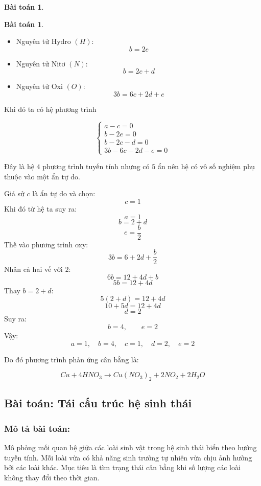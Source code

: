 \documentclass[12pt,a4paper,oneside]{book}
\theoremstyle{theorem}
\theoremstyle{definition}
\newtheorem{bt}[theorem2]{Bài toán}
\begin{document}
\begin{bt}
\begin{bt}
\begin{itemize}
    \item Nguyên tử Hydro \((H)\):
    \[
    b=2e
    \]

    \item Nguyên tử Nitơ \((N)\):
    \[
    b=2c+d
    \]

    \item Nguyên tử Oxi \((O)\):
    \[
    3b=6c+2d+e
    \]
\end{itemize}

Khi đó ta có hệ phương trình

\[
\begin{cases}
a-c=0\\
b-2e=0\\
b-2c-d=0\\
3b-6c-2d-e=0
\end{cases}
\]

Đây là hệ \(4\) phương trình tuyến tính nhưng có \(5\) ẩn nên hệ có vô số
nghiệm phụ thuộc vào một ẩn tự do.

Giả sử \(c\) là ẩn tự do và chọn:
\[
c=1
\]
Khi đó từ hệ ta suy ra:
\[
a=1
\]
\[
b=2+d
\]
\[
e=\frac{b}{2}
\]
Thế vào phương trình oxy:
\[
3b=6+2d+\frac{b}{2}
\]
Nhân cả hai vế với \(2\):
\[
6b=12+4d+b
\]
\[
5b=12+4d
\]
Thay \(b=2+d\):
\[
5(2+d)=12+4d
\]
\[
10+5d=12+4d
\]
\[
d=2
\]
Suy ra:
\[
b=4,\qquad e=2
\]
Vậy:
\[
a=1,\quad b=4,\quad c=1,\quad d=2,\quad e=2
\]

Do đó phương trình phản ứng cân bằng là:

\[
Cu+4HNO_3\rightarrow Cu(NO_3)_2+2NO_2+2H_2O
\]

\end{bt}
\end{bt}

    
\subsection{Bài toán: Tái cấu trúc hệ sinh thái}
\subsubsection{Mô tả bài toán:}
Mô phỏng mối quan hệ giữa các loài sinh vật trong hệ sinh thái biển theo
hướng tuyến tính. Mỗi loài vừa có khả năng sinh trưởng tự nhiên vừa chịu ảnh
hưởng bởi các loài khác. Mục tiêu là tìm trạng thái cân bằng khi số lượng các
loài không thay đổi theo thời gian.
\end{document}
